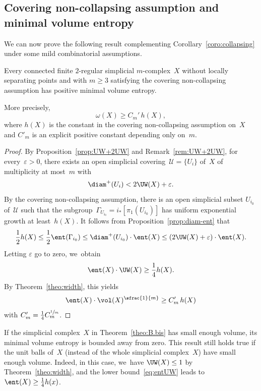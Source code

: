 \subsection{Covering non-collapsing assumption and minimal volume entropy}

We can now prove the following result complementing Corollary~\ref{coro:collapsing} under some mild combinatorial assumptions.

\begin{theorem} \label{theo:B.bis}
Every connected finite $2$-regular simplicial $m$\nobreakdash-complex~$X$ without locally separating points
and with $m \geq 3$ satisfying the covering non-collapsing assumption has positive minimal volume entropy.

More precisely,
\[
\omega(X) \geq C_m' \, h(X),
\]
where $h(X)$ is the constant in the covering non-collapsing assumption on~$X$ and $C'_m$ is an explicit positive constant depending only on~$m$.
\end{theorem}

\begin{proof}
By Proposition~\ref{prop:UW+2UW} and Remark~\ref{rem:UW+2UW}, for every~$\varepsilon >0$, there exists an open simplicial covering~$\mathcal{U}=\{U_i\}$ of~$X$ of multiplicity at most~$m$ with
\[
\diam^+(U_i) < 2\UW(X) + \varepsilon.
\]
By the covering non-collapsing assumption, there is an open simplicial subset $U_{i_0}$ of~$\mathcal{U}$ such that the subgroup~$\Gamma_{U_{i_0}}=i_*[\pi_1(U_{i_0})]$ has uniform exponential growth at least~$h(X)$.
It follows from Proposition~\ref{prop:diam-ent} that
\[
\frac{1}{2} h(X) \leq \frac{1}{2} \ent(\Gamma_{i_0}) \leq \diam^+(U_{i_0}) \cdot \ent(X) \leq (2 \UW(X) + \varepsilon) \cdot \ent(X).
\]
Letting $\varepsilon$ go to zero, we~obtain
\begin{equation} \label{eq:entUW}
\ent(X) \cdot \UW(X) \geq \frac{1}{4} h(X).
\end{equation}
By Theorem~\ref{theo:width}, this yields
\[
\ent(X) \cdot \vol(X)^{\sfrac{1}{m}} \geq C'_m \, h(X)
\]
with $C'_m = \frac{1}{4} C_m^{\sfrac{1}{m}}$.
\end{proof}

\begin{remark} \label{rem:entUW}
If the simplicial complex~$X$ in Theorem~\ref{theo:B.bis} has small enough volume, its minimal volume entropy is bounded away from zero.
This result still holds true if the unit balls of~$X$ (instead of the whole simplicial complex~$X$) have small enough volume.
Indeed, in this case, we~have $\UW(X) \leq 1$ by Theorem~\ref{theo:width}, and the lower bound~\eqref{eq:entUW} leads to $\ent(X) \geq \frac{1}{4} h(x)$.
\end{remark}

